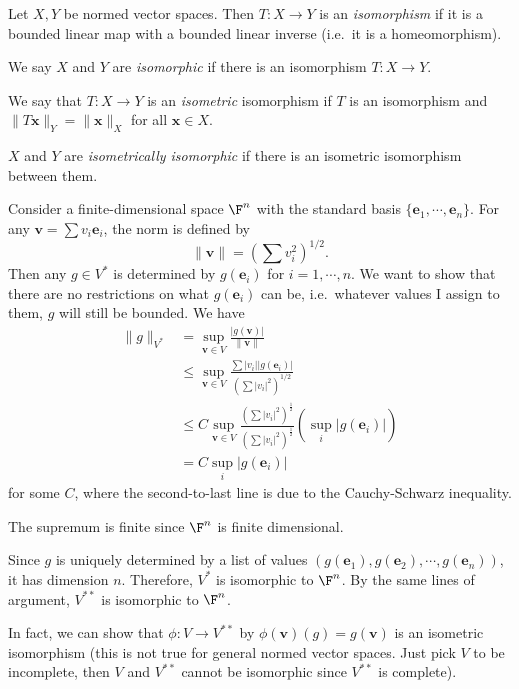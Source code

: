 \documentclass[a4paper]{article}
\begin{document}
\begin{defi}[Isomorphism]
  Let $X, Y$ be normed vector spaces. Then $T: X\to Y$ is an \emph{isomorphism} if it is a bounded linear map with a bounded linear inverse (i.e.\ it is a homeomorphism).

  We say $X$ and $Y$ are \emph{isomorphic} if there is an isomorphism $T: X\to Y$.

  We say that $T: X\to Y$ is an \emph{isometric} isomorphism if $T$ is an isomorphism and $\|T\mathbf{x}\|_Y = \|\mathbf{x}\|_X$ for all $\mathbf{x}\in X$.

  $X$ and $Y$ are \emph{isometrically isomorphic} if there is an isometric isomorphism between them.
\end{defi}

\begin{eg}
  Consider a finite-dimensional space $\F^n$ with the standard basis $\{\mathbf{e}_1, \cdots, \mathbf{e}_n\}$. For any $\mathbf{v} = \sum v_i \mathbf{e}_i$, the norm is defined by
  \[
    \|\mathbf{v}\| = \left(\sum v_i^2\right)^{1/2}.
  \]
  Then any $g\in V^*$ is determined by $g(\mathbf{e}_i)$ for $i = 1, \cdots, n$. We want to show that there are no restrictions on what $g(\mathbf{e}_i)$ can be, i.e.\ whatever values I assign to them, $g$ will still be bounded. We have
  \begin{align*}
    \|g\|_{V^*} &= \sup_{\mathbf{v}\in V}\frac{|g(\mathbf{v})|}{\|\mathbf{v}\|}\\
    &\leq \sup_{\mathbf{v}\in V}\frac{\sum |v_i||g(\mathbf{e}_i)|}{(\sum |v_i|^2)^{1/2}}\\
    &\leq C\sup_{\mathbf{v}\in V}\frac{(\sum |v_i|^2)^{\frac{1}{2}}}{(\sum|v_i|^2)^{\frac{1}{2}}}\left(\sup_i |g(\mathbf{e}_i)|\right)\\
    &= C\sup_i |g(\mathbf{e}_i)|
  \end{align*}
  for some $C$, where the second-to-last line is due to the Cauchy-Schwarz inequality.

  The supremum is finite since $\F^n$ is finite dimensional.

  Since $g$ is uniquely determined by a list of values $(g(\mathbf{e}_1), g(\mathbf{e}_2), \cdots, g(\mathbf{e}_n))$, it has dimension $n$. Therefore, $V^*$ is isomorphic to $\F^n$. By the same lines of argument, $V^{**}$ is isomorphic to $\F^n$.

  In fact, we can show that $\phi: V\to V^{**}$ by $\phi(\mathbf{v})(g) = g(\mathbf{v})$ is an isometric isomorphism (this is not true for general normed vector spaces. Just pick $V$ to be incomplete, then $V$ and $V^{**}$ cannot be isomorphic since $V^{**}$ is complete).
\end{eg}
\end{document}
